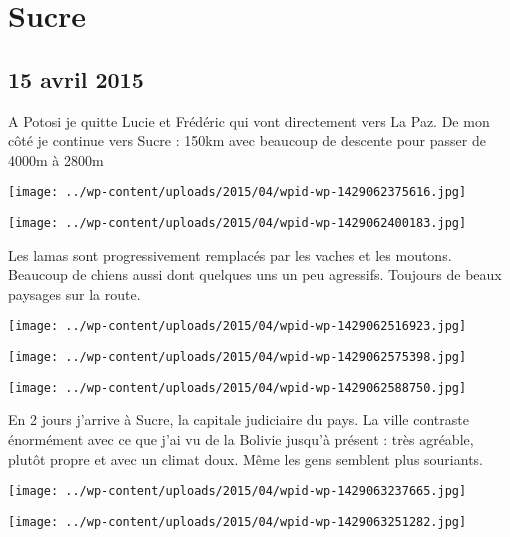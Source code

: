 \chapter{Sucre}
\section*{15 avril 2015}
A Potosi je quitte Lucie et Frédéric qui vont directement vers La Paz. \newline
 De mon côté je continue vers Sucre : 150km avec beaucoup de descente pour passer de 4000m à 2800m \newline
 \newline
\centerline{\texttt{[image: ../wp-content/uploads/2015/04/wpid-wp-1429062375616.jpg]} } 
 \newline
 \newline
\centerline{\texttt{[image: ../wp-content/uploads/2015/04/wpid-wp-1429062400183.jpg]} } 
 \newline
 Les lamas sont progressivement remplacés par les vaches et les moutons. Beaucoup de chiens aussi dont quelques uns un peu agressifs. \newline
 Toujours de beaux paysages sur la route.  \newline
 \newline
\centerline{\texttt{[image: ../wp-content/uploads/2015/04/wpid-wp-1429062516923.jpg]} } 
 \newline
 \newline
\centerline{\texttt{[image: ../wp-content/uploads/2015/04/wpid-wp-1429062575398.jpg]} } 
 \newline
 \newline
\centerline{\texttt{[image: ../wp-content/uploads/2015/04/wpid-wp-1429062588750.jpg]} } 
 \newline
 En 2 jours j'arrive à Sucre, la capitale judiciaire du pays. \newline
 La ville contraste énormément avec ce que j'ai vu de la Bolivie jusqu'à présent : très agréable, plutôt propre et avec un climat doux. Même les gens semblent plus souriants.  \newline
 \newline
\centerline{\texttt{[image: ../wp-content/uploads/2015/04/wpid-wp-1429063237665.jpg]} } 
 \newline
 \newline
\centerline{\texttt{[image: ../wp-content/uploads/2015/04/wpid-wp-1429063251282.jpg]} } 
